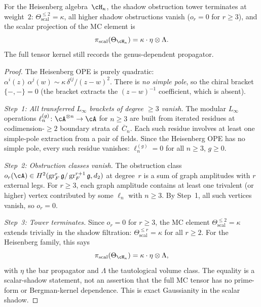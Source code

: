 \begin{proposition}
\label{prop:heisenberg-gaussian-termination}
\label{prop:heisenberg-eisenstein-master-mc}
For the Heisenberg algebra~$\cH_\kappa$, the shadow
obstruction tower terminates at weight~$2$:
$\Theta^{\leq 2}_{\mathrm{scal}} = \kappa$, all higher shadow
obstructions vanish ($o_r = 0$ for $r \geq 3$), and the scalar
projection of the MC element is
\[
\pi_{\mathrm{scal}}(\Theta_{\cH_\kappa})
=\kappa \cdot \eta \otimes \Lambda .
\]
The full tensor kernel still records the genus-dependent propagator.
\end{proposition}

\begin{proof}
The Heisenberg OPE is purely quadratic:
$\alpha^i(z)\,\alpha^j(w) \sim
 \kappa\,\delta^{ij}/(z-w)^2$.
There is \emph{no simple pole}, so the chiral bracket
$\{-,-\} = 0$ (the bracket extracts the $(z-w)^{-1}$
coefficient, which is absent).

\emph{Step~1: All transferred $L_\infty$ brackets of
degree $\geq 3$ vanish.}
The modular $L_\infty$ operations
$\ell_n^{(g)}\colon \cA^{\otimes n} \to \cA$ for
$n \geq 3$ are built from iterated residues at
codimension-$\geq 2$ boundary strata of~$\overline{C}_n$.
Each such residue involves at least one simple-pole
extraction from a pair of fields. Since the Heisenberg OPE
has no simple pole, every such residue vanishes:
$\ell_n^{(g)} = 0$ for all $n \geq 3$, $g \geq 0$.

\emph{Step~2: Obstruction classes vanish.}
The obstruction class $o_r(\cA) \in
H^2(\operatorname{gr}_F^r \mathfrak{g}/\operatorname{gr}_F^{r+1}\mathfrak{g}, d_2)$
at degree~$r$ is a sum of graph amplitudes with $r$
external legs. For $r \geq 3$, each graph amplitude
contains at least one trivalent (or higher) vertex
contributed by some $\ell_n$ with $n \geq 3$.
By Step~1, all such vertices vanish, so $o_r = 0$.

\emph{Step~3: Tower terminates.}
Since $o_r = 0$ for $r \geq 3$, the MC element
$\Theta^{\leq 2}_{\mathrm{scal}} = \kappa$ extends trivially in the
shadow filtration:
$\Theta^{\leq r}_{\mathrm{scal}}=\kappa$ for all $r\ge2$.
For the Heisenberg family, this says
\[
\pi_{\mathrm{scal}}(\Theta_{\cH_\kappa})
= \kappa \cdot \eta \otimes \Lambda,
\]
with $\eta$ the bar propagator and $\Lambda$ the tautological volume
class. The equality is a scalar-shadow statement, not an assertion
that the full MC tensor has no prime-form or Bergman-kernel
dependence. This is exact Gaussianity in the scalar shadow.
\end{proof}

